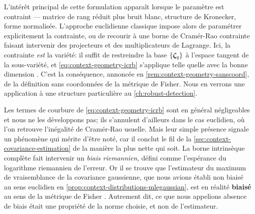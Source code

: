 \begin{remark}
  L'intérêt principal de cette formulation apparaît lorsque le paramètre est contraint --- matrice de rang réduit plus bruit blanc, structure de Kronecker, forme normalisée. L'approche euclidienne classique impose alors de paramétrer explicitement la contrainte, ou de recourir à une borne de Cramér-Rao contrainte faisant intervenir des projecteurs et des multiplicateurs de Lagrange. Ici, la contrainte \emph{est} la variété: il suffit de restreindre la base $\{\boldsymbol{\zeta}_q\}$ à l'espace tangent de la sous-variété, et \cref{eq:context-geometry-icrb} s'applique telle quelle avec la bonne dimension . C'est la conséquence, annoncée en \cref{rem:context-geometry-sanscoord}, de la définition sans coordonnées de la métrique de Fisher. Nous en verrons une application à une structure particulière au \cref{ch:robust-detection}.
\end{remark}

\begin{remark}
\label{rem:context-geometry-biaisintrinseque}
  Les termes de courbure de \cref{eq:context-geometry-icrb} sont en général négligeables et nous ne les développons pas; ils s'annulent d'ailleurs dans le cas euclidien, où l'on retrouve l'inégalité de Cramér-Rao usuelle. Mais leur simple présence signale un phénomène qui mérite d'être noté, car il conclut le fil de la \cref{sec:context-covariance-estimation} de la manière la plus nette qui soit. La borne intrinsèque complète fait intervenir un \emph{biais riemannien}, défini comme l'espérance du logarithme riemannien de l'erreur. Or il se trouve que l'estimateur du maximum de vraisemblance de la covariance gaussienne, que nous avions établi non biaisé au sens euclidien en \cref{prop:context-distributions-mlegaussian}, est en réalité \textbf{biaisé} au sens de la métrique de Fisher . Autrement dit, ce que nous appelions absence de biais était une propriété de la norme choisie, et non de l'estimateur.
\end{remark}

